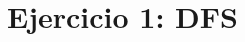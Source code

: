 \documentclass[../main.tex]{subfiles}
\begin{document}
\section{Ejercicio 1: DFS}
\label{sec:ej1}
\end{document}
